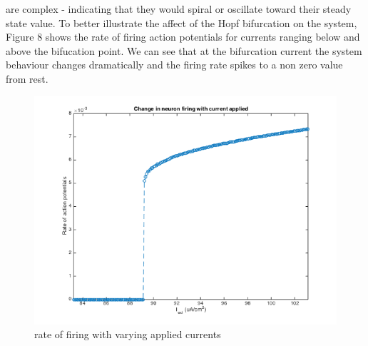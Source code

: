 \documentclass[10pt]{report}
\begin{document}
\begin{enumerate}
are complex - indicating that they would spiral or oscillate toward their steady state value. To better illustrate the affect of the Hopf bifurcation on the system, Figure 8 shows the rate of firing action potentials for currents ranging below and above the bifucation point. We can see that at the bifurcation current the system behaviour changes dramatically and the firing rate spikes to a non zero value from rest. \begin{figure}[h!] \includegraphics[scale=0.45]{motnq102.png} \caption[h8]{rate of firing with varying applied currents} \end{figure} 
%
%

\end{enumerate}
\end{document}
